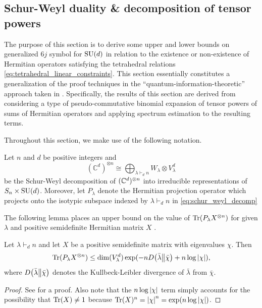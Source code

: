 \documentclass[notitlepage, 10pt]{article}
\begin{document}
\subsection{Schur-Weyl duality \& decomposition of tensor powers}
\label{eq:schur_weyl_and_tensor_powers}

{\color{blue}
The purpose of this section is to derive some upper and lower bounds on generalized $6j$ symbol for $\operatorname{SU}(d)$ in relation to the existence or non-existence of Hermitian operators satisfying the tetrahedral relations \cref{eq:tetrahedral_linear_constraints}.
This section essentially constitutes a generalization of the proof techniques in the ``quantum-information-theoretic'' approach taken in \cite{christandl2008quantum}.
Specifically, the results of this section are derived from considering a type of pseudo-commutative binomial expansion of tensor powers of sums of Hermitian operators and applying spectrum estimation to the resulting terms.
}

Throughout this section, we make use of the following notation.
\begin{defn}
    Let $n$ and $d$ be positive integers and 
    \begin{equation}
        \label{eq:schur_weyl_decomp}
        (\mathbb C^{d})^{\otimes n} \cong \bigoplus_{\lambda \vdash_{d} n} W_{\lambda} \otimes V_{\lambda}^{d}
    \end{equation}
    be the Schur-Weyl decomposition of $(\mathbb C^{d})^{\otimes n}$ into irreducible representations of $S_n \times \operatorname{SU}(d)$.
    Moreover, let $P_{\lambda}$ denote the Hermitian projection operator which projects onto the isotypic subspace indexed by $\lambda \vdash_{d} n$ in \cref{eq:schur_weyl_decomp}
\end{defn}

The following lemma places an upper bound on the value of $\operatorname{Tr}(P_{\lambda} X^{\otimes n})$ for given $\lambda$ and positive semidefinite Hermitian matrix $X$ \cite{christandl2008quantum,keyl2001estimating}.
\begin{prop}
    \label{prop:spec_est}
    Let $\lambda \vdash_{d} n$ and let $X$ be a positive semidefinite matrix with eigenvalues $\chi$.
    Then
    \begin{equation}
        \operatorname{Tr}(P_{\lambda} X^{\otimes n}) \leq \dim(V_{\lambda}^{d}) \exp(-n D\!\left(\bar \lambda\middle\|\bar \chi\right) + n \log \left|\chi\right|),
    \end{equation}
    where $D\!\left(\bar \lambda\middle\|\bar \chi\right)$ denotes the Kullbeck-Leibler divergence of $\bar \lambda$ from $\bar \chi$.
\end{prop}
\begin{proof}
    See \cite{keyl2001estimating} for a proof.
    Also note that the $n\log \left|\chi\right|$ term simply accounts for the possibility that $\operatorname{Tr}(X) \neq 1$ because $\operatorname{Tr}(X)^{n} = \left|\chi\right|^{n} = \exp(n \log \left|\chi\right|)$.
\end{proof}
\end{document}
